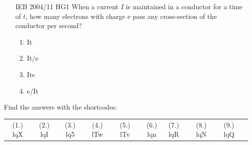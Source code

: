 \begin{enumerate}[noitemsep, label=\textbf{\arabic*}. ]
\begin{enumerate}[noitemsep, label=\textbf{\alph*}. ]
{\begin{center}
\begin{xtabular*}{\mytablewidth}[t]{|p{10\mystarwidth}|p{10\mystarwidth}|p{10\mystarwidth}|}
        decreases%
     \tabularnewline{}
    \end{xtabular*}
      \end{center}
    \begin{center}{\small\bfseries Table 16.4}\end{center}
    
    \addtocounter{footnote}{-0}
    
        }%
      
    \par
  \end{enumerate}
                  \label{m38776*uid104}\item [IEB 2004/11 HG1] When a current \begin{math}I\end{math} is maintained in a conductor for a time of \begin{math}t\end{math}, how many electrons with charge e pass any cross-section of the conductor per second?
\label{m38776*id68784}\begin{enumerate}[noitemsep, label=\textbf{\alph*}. ] 
            \label{m38776*uid105}\item It
\label{m38776*uid106}\item It/e
\label{m38776*uid107}\item Ite
\label{m38776*uid108}\item e/It
\end{enumerate}
                  \end{enumerate}
        
    



  \label{m38776**end}
          
       
    
  \label{f13bac5321b85aca0e213ebdf4f72465**end}
    
\par {} Find the answers with the shortcodes:
 \par \begin{tabular}[h]{cccccc}
 (1.) lqX  &  (2.) lqI  &  (3.) lq5  &  (4.) lTw  &  (5.) lTv  &  (6.) lqn  &  (7.) lqR  &  (8.) lqN  &  (9.) lqQ  & \end{tabular}



